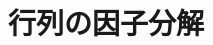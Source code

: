 \documentclass[../../topic_linear-algebra]{subfiles}
\begin{document}
\chapter{行列の因子分解}\label{ch:factorization}
\end{document}
